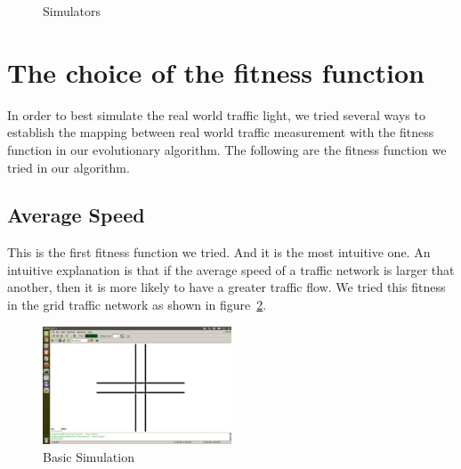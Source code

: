 \documentclass{article} %
\begin{document}
\begin{figure}[h]
 \centering
  \caption{Simulators}
   \label{fig:simulator} %
\end{figure}


\section{The choice of the fitness function}
In order to best simulate the real world traffic light, we tried several ways to establish the mapping between real world traffic measurement with the fitness function in our evolutionary algorithm. The following are the fitness function we tried in our algorithm.
\subsection{Average Speed}
This is the first fitness function we tried. And it is the most intuitive one. An intuitive explanation is that if the average speed of a traffic network is larger that another, then it is more likely to have a greater traffic flow. We tried this fitness in the grid traffic network as shown in figure~\ref{fig:gridoptimum}.

\begin{figure}[h]
\centering
\includegraphics[width=0.5\textwidth]{images/simulator/gridoptimum.png}
\caption{Basic Simulation}
\label{fig:gridoptimum}
\end{figure}
\end{document}
